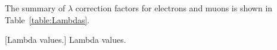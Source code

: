 The summary of $\lambda$ correction factors for electrons and muons is shown in Table~\ref{table:Lambdas}.
\begin{multiFigure}
    \centering
    [Lambda values.] %
    {Lambda values.} %
    \label{table:Lambdas}
\end{multiFigure}
